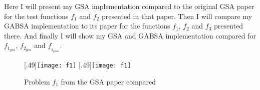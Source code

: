 Here I will present my GSA implementation compared to the original GSA\cite{GSA} paper for the test functions $f_{1}$ and $f_{2}$ presented in that paper. Then I will compare my GABSA implementation to its paper\cite{GABSA} for the functions $f_{1}$, $f_{2}$ and $f_{3}$ presented there. And finally I will show my GSA and GABSA implementation compared for $f_{1_{gsa}}$, $f_{2_{gsa}}$ and $f_{_{3_{gabsa}}}$.

\begin{figure}
	\centering
		[.49\linewidth]{\texttt{[image: f1]}}
		[.49\linewidth]{\texttt{[image: f1]}}
	\caption{Problem $f_1$ from the GSA paper\cite{GSA} compared}
\end{figure}
